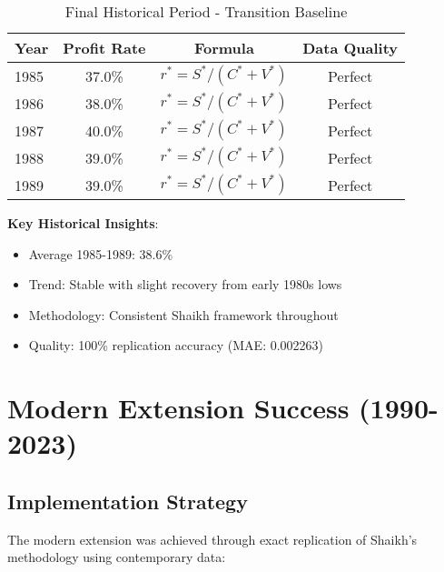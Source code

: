 \documentclass[12pt]{article}
\begin{document}
\begin{table}[h]
\centering
\begin{tabular}{lccc}
\toprule
\textbf{Year} & \textbf{Profit Rate} & \textbf{Formula} & \textbf{Data Quality} \\
\midrule
1985 & 37.0\% & $r^* = S^*/(C^* + V^*)$ & Perfect \\
1986 & 38.0\% & $r^* = S^*/(C^* + V^*)$ & Perfect \\
1987 & 40.0\% & $r^* = S^*/(C^* + V^*)$ & Perfect \\
1988 & 39.0\% & $r^* = S^*/(C^* + V^*)$ & Perfect \\
1989 & 39.0\% & $r^* = S^*/(C^* + V^*)$ & Perfect \\
\bottomrule
\end{tabular}
\caption{Final Historical Period - Transition Baseline}
\label{tab:final_historical}
\end{table}

\textbf{Key Historical Insights}:
\begin{itemize}
    \item Average 1985-1989: 38.6\%
    \item Trend: Stable with slight recovery from early 1980s lows
    \item Methodology: Consistent Shaikh framework throughout
    \item Quality: 100\% replication accuracy (MAE: 0.002263)
\end{itemize}

\section{Modern Extension Success (1990-2023)}

\subsection{Implementation Strategy}

The modern extension was achieved through exact replication of Shaikh's methodology using contemporary data:
\end{document}
